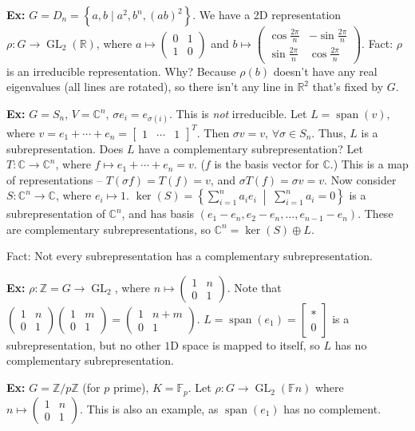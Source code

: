 \documentclass[10pt,letterpaper]{article}
\newcommand{\n}{\hfill\break}
\newcommand{\hangblock}[2]{\par\noindent\settowidth{\hangindent}{\textbf{#1: }}\textbf{#1: }\!\!\!#2}
\newcommand{\ex}[1]{\hangblock{Ex}{#1}}
\newcommand{\set}[1]{\left\{#1\right\}}
\newcommand{\integers}{\mathbb{Z}}
\newcommand{\Z}{\integers}
\newcommand{\reals}{\mathbb{R}}
\newcommand{\R}{\reals}
\newcommand{\complex}{\mathbb{C}}
\newcommand{\C}{\complex}
\newcommand{\tpose}{^{T}\!}
\DeclareMathOperator{\GL}{GL}
\DeclareMathOperator{\vspan}{span}
\newcommand{\smallPMatrix}[1]{\paren{\begin{smallmatrix}#1\end{smallmatrix}}}
\newcommand{\smallBMatrix}[1]{\brack{\begin{smallmatrix}#1\end{smallmatrix}}}
\newcommand{\F}{\mathbb{F}}
\newcommand{\paren}[1]{\left(#1\right)}
\renewcommand{\brack}[1]{\left[#1\right]}
\begin{document}
\ex{
	$G=D_{n}=\set{a,b\mid{}a^{2},b^{n},(ab)^{2}}$. We have a 2D representation $\rho:G\to\GL_{2}(\R)$, where $a\mapsto\smallPMatrix{0 & 1\\ 1 & 0}$ and $b\mapsto\smallPMatrix{\cos\frac{2\pi}{n} & -\sin\frac{2\pi}{n}\\ \sin\frac{2\pi}{n} & \cos\frac{2\pi}{n}}$.\n
	Fact: $\rho$ is an irreducible representation. Why? Because $\rho(b)$ doesn't have any real eigenvalues (all lines are rotated), so there isn't any line in $\R^{2}$ that's fixed by $G$.\n
}

\ex{
	$G=S_{n}$, $V=\C^{n}$, $\sigma{}e_{i}=e_{\sigma(i)}$.\n
	This is \textit{not} irreducible. Let $L=\vspan(v)$, where $v=e_{1}+\cdots+e_{n}=\smallBMatrix{1 & \cdots & 1}\tpose$. Then $\sigma{}v=v$, $\forall{}\sigma\in{}S_{n}$. Thus, $L$ is a subrepresentation.\n
	\n
	Does $L$ have a complementary subrepresentation?\n
	Let $T:\C\to\C^{n}$, where $f\mapsto{}e_{1}+\cdots+e_{n}=v$. ($f$ is the basis vector for $\C$.) This is a map of representations -- $T(\sigma{}f)=T(f)=v$, and $\sigma{}T(f)=\sigma{}v=v$.\n
	Now consider $S:\C^{n}\to\C$, where $e_{i}\mapsto{}1$. $\ker(S)=\set{\sum_{i=1}^{n}a_{i}e_{i}\;\middle|\;\sum_{i=1}^{n}a_{i}=0}$ is a subrepresentation of $\C^{n}$, and has basis $(e_{1}-e_{n},e_{2}-e_{n},\ldots,e_{n-1}-e_{n})$.\n
	These are complementary subrepresentations, so $\C^{n}=\ker(S)\oplus{}L$.\n
}

\par\noindent
Fact: Not every subrepresentation has a complementary subrepresentation.\n

\ex{
	$\rho:\Z=G\to\GL_{2}$, where $n\mapsto\smallPMatrix{1 & n\\ 0 & 1}$. Note that $\smallPMatrix{1 & n\\ 0 & 1}\smallPMatrix{1 & m\\ 0 & 1}=\smallPMatrix{1 & n+m\\ 0 & 1}$. $L=\vspan(e_{1})=\smallBMatrix{*\\ 0}$ is a subrepresentation, but no other $1$D space is mapped to itself, so $L$ has no complementary subrepresentation.\n
}

\ex{
	$G=\Z/p\Z$ (for $p$ prime), $K=\F_{p}$.\n
	Let $\rho:G\to\GL_{2}(\F{n})$ where $n\mapsto\smallPMatrix{1 & n\\ 0 & 1}$. This is also an example, as $\vspan(e_{1})$ has no complement.\n
}
\end{document}
